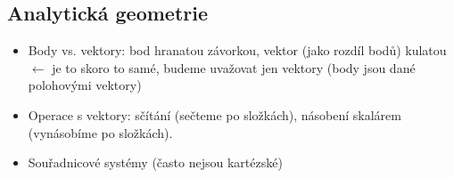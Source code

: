 \documentclass[12pt]{article}					%
\begin{document}
    \subsection{Analytická geometrie}
        \begin{poznamka}[Názvosloví]
            \begin{itemize}
                \item Body vs. vektory: bod hranatou závorkou, vektor (jako rozdíl bodů) kulatou $\leftarrow$ je to skoro to samé, budeme uvažovat jen vektory (body jsou dané polohovými vektory)
                \item Operace s vektory: sčítání (sečteme po složkách), násobení skalárem (vynásobíme po složkách).
                \item Souřadnicové systémy (často nejsou kartézské)
            \end{itemize}
        \end{poznamka}
    
\end{document}
